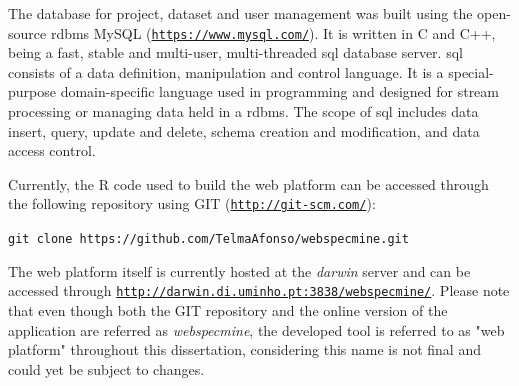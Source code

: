 The database for project, dataset and user management was built using the open-source \gls{rdbms} MySQL (\href{https://www.mysql.com/}{\nolinkurl{https://www.mysql.com/}}). It is written in C and C++, being a fast, stable and multi-user, multi-threaded \gls{sql} database server. \gls{sql} consists of a data definition, manipulation and control language. It is a special-purpose domain-specific language used in programming and designed for stream processing or managing data held in a \gls{rdbms}. The scope of \gls{sql} includes data insert, query, update and delete, schema creation and modification, and data access control. 

Currently, the R code used to build the web platform can be accessed through the following repository using GIT (\href{http://git-scm.com/}{\nolinkurl{http://git-scm.com/}}):

\verb|git clone https://github.com/TelmaAfonso/webspecmine.git|

The web platform itself is currently hosted at the \textit{darwin} server and can be accessed through \href{http://darwin.di.uminho.pt:3838/webspecmine/}{\nolinkurl{http://darwin.di.uminho.pt:3838/webspecmine/}}. Please note that even though both the GIT repository and the online version of the application are referred as \textit{webspecmine}, the developed tool is referred to as "web platform" throughout this dissertation, considering this name is not final and could yet be subject to changes.



